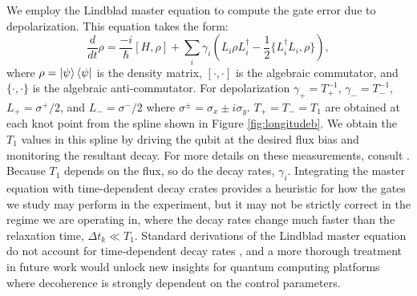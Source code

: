 We employ the Lindblad master equation
to compute the gate error due to depolarization.
This equation takes the form:
\begin{equation}
  \frac{d}{dt} \rho = \frac{-i}{\hbar} [H, \rho]
  + \sum_{i} \gamma_{i} (L_{i} \rho L_{i}^{\dagger}
  - \frac{1}{2} \{L_{i}^{\dagger} L_{i}, \rho\}),
\end{equation}
where $\rho = \ket{\psi}\bra{\psi}$ is the density matrix,
$[\cdot, \cdot]$ is the algebraic commutator, and $\{\cdot, \cdot \}$ is the algebraic
anti-commutator.
For depolarization $\gamma_{+} = T_{+}^{-1}$,
$\gamma_{-} = T_{-}^{-1}$,
$L_{+} = \sigma^{+}/2$, and
$L_{-} = \sigma^{-}/2$ where $\sigma^{\pm} = \sigma_{x} \pm i \sigma_{y}$.
$T_{+} = T_{-} = T_{1}$ are obtained at each knot point
from the spline shown in Figure \ref{fig:longitudeb}.
We obtain the $T_{1}$ values in this spline
by driving the qubit at the desired flux bias
and monitoring the resultant decay. For more details
on these measurements, consult \cite{zhang2020universal}.
Because $T_{1}$ depends on the flux, so do
the decay rates, $\gamma_{i}$.
Integrating the master equation with time-dependent decay crates
provides a heuristic for how the gates we study may perform in
the experiment, but it may not be strictly correct in the regime we
are operating in, where the decay rates change much faster
than the relaxation time, $\Delta t_{k} \ll T_{1}$. Standard
derivations of the Lindblad master equation do not account for
time-dependent decay rates \cite{manzano2020a}, and a more thorough
treatment in future work would unlock new insights for
quantum computing platforms where decoherence is strongly
dependent on the control parameters.

